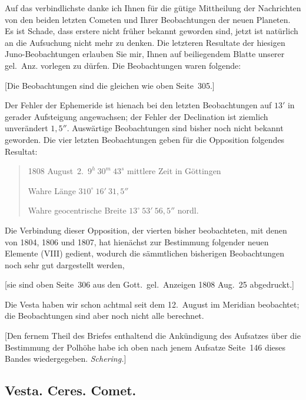 \documentclass[12pt,a4paper]{book}
\begin{document}
Auf das verbindlichste danke ich Ihnen f\"ur die g\"utige Mittheilung der Nachrichten von den beiden letzten Cometen und Ihrer Beobachtungen der neuen Planeten. Es ist Schade, dass erstere nicht fr\"uher bekannt geworden sind, jetzt ist nat\"urlich an die Aufsuchung nicht mehr zu denken. Die letzteren Resultate der hiesigen Juno-Beobachtungen erlauben Sie mir, Ihnen auf beiliegendem Blatte unserer gel.~Anz. vorlegen zu d\"urfen. Die Beobachtungen waren folgende:

[Die Beobachtungen sind die gleichen wie oben Seite~305.]

Der Fehler der Ephemeride ist hienach bei den letzten Beobachtungen auf $13'$ in gerader Aufsteigung angewachsen; der Fehler der Declination ist ziemlich unver\"andert $1{,}5''$. Ausw\"artige Beobachtungen sind bisher noch nicht bekannt geworden. Die vier letzten Beobachtungen geben f\"ur die Opposition folgendes Resultat:

\begin{quote}
1808 August~2.\ $9^{h}\ 30^{m}\ 43^{s}$ mittlere Zeit in G\"ottingen

Wahre L\"ange \dotfill $310^{\circ}\ 16'\ 31{,}5''$

Wahre geocentrische Breite \dotfill $13^{\circ}\ 53'\ 56{,}5''$ nordl.
\end{quote}

Die Verbindung dieser Opposition, der vierten bisher beobachteten, mit denen von 1804, 1806 und 1807, hat hien\"achst zur Bestimmung folgender neuen Elemente (VIII) gedient, wodurch die s\"ammtlichen bisherigen Beobachtungen noch sehr gut dargestellt werden,

[sie sind oben Seite~306 aus den Gott.~gel.~Anzeigen 1808 Aug.~25 abgedruckt.]

Die Vesta haben wir schon achtmal seit dem 12.~August im Meridian beobachtet; die Beobachtungen sind aber noch nicht alle berechnet.

[Den fernem Theil des Briefes enthaltend die Ank\"undigung des Aufsatzes \"uber die Bestimmung der Polh\"ohe habe ich oben nach jenem Aufsatze Seite~146 dieses Bandes wiedergegeben. \textit{Schering.}]


\newpage
\subsection*{Vesta. Ceres. Comet.}
\end{document}
